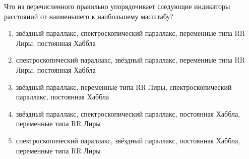Что из перечисленного правильно упорядочивает следующие
индикаторы расстояний от наименьшего к наибольшему масштабу?

\begin{enumerate}[label=\alph*)]
  \item звёздный параллакс, спектроскопический параллакс, переменные
типа RR Лиры, постоянная Хаббла
  \item спектроскопический параллакс, звёздный параллакс, переменные
типа RR Лиры, постоянная Хаббла
  \item звёздный параллакс, переменные типа RR Лиры, спектроскопический
параллакс, постоянная Хаббла
  \item звёздный параллакс, спектроскопический параллакс, постоянная
Хаббла, переменные типа RR Лиры
  \item спектроскопический параллакс, звёздный параллакс, постоянная
Хаббла, переменные типа RR Лиры
\end{enumerate}
